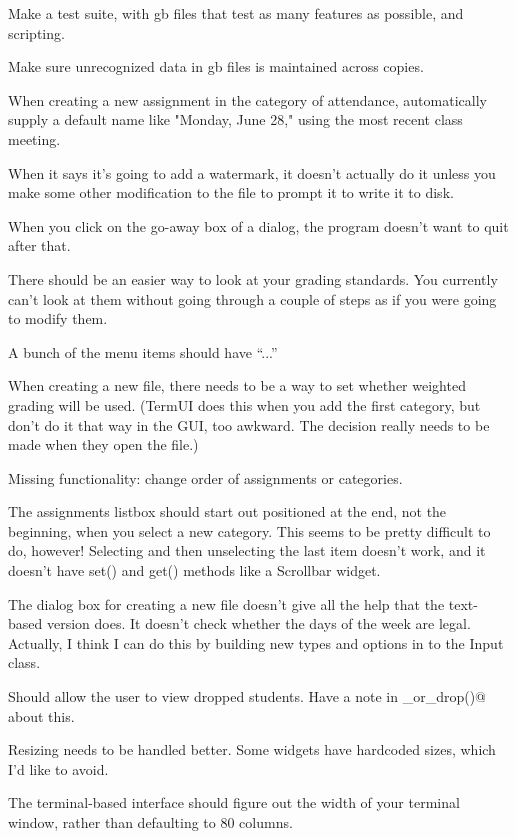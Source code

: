 \documentclass{opengrade_doc}
\begin{document}
Make a test suite, with gb files that test as many features as possible,
and scripting.

Make sure unrecognized data in gb files is maintained across copies.

When creating a new assignment in the category of attendance, automatically supply a default
     name like "Monday, June 28," using the most recent class meeting.

When it says it's going to add a watermark, it doesn't actually do it unless you make some
other modification to the file to prompt it to write it to disk.

When you click on the go-away box of a dialog, the program doesn't want to quit after that.

There should be an easier way to look at your grading standards. You currently
can't look at them without going through a couple of steps as if you were
going to modify them.

A bunch of the menu items should have ``...''

When creating a new file, there needs to be a way to set whether weighted grading
will be used. (TermUI does this when you add the first category, but don't do it
that way in the GUI, too awkward. The decision really needs to be made when they
open the file.) 

Missing functionality: 
change order of assignments or categories.

The assignments listbox should start out positioned
at the end, not the beginning, when you select a new category. This seems to be
pretty difficult to do, however! Selecting and then unselecting the last item
doesn't work, and it doesn't have set() and get() methods like a Scrollbar widget.

The dialog box for creating a new file doesn't give all the
help that the text-based version does. It doesn't check 
 whether the days of the week are legal. Actually, I think
I can do this by building new types and options in to the Input class.

Should allow the user to view dropped students. Have a note in 
\verb@add_or_drop()@
about this.

Resizing needs to be handled better. Some widgets have hardcoded sizes, which
I'd like to avoid.


The terminal-based interface should figure out the width of your terminal
window, rather than defaulting to 80 columns.
\end{document}
